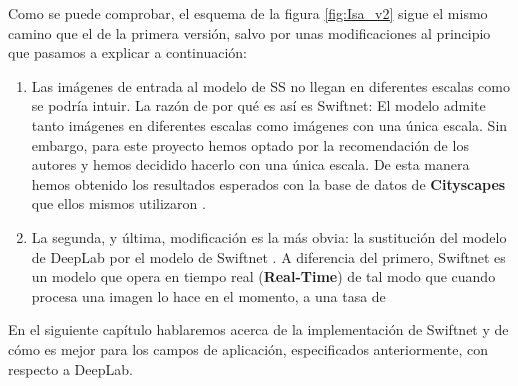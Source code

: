Como se puede comprobar, el esquema de la figura \ref{fig:Isa_v2} sigue el mismo camino que el de la primera versión, salvo por unas modificaciones al principio que pasamos a explicar a continuación:

\begin{enumerate}

\item Las imágenes de entrada al modelo de \ac{SS} no llegan en diferentes escalas como se podría intuir. La razón de por qué es así es Swiftnet: El modelo admite tanto imágenes en diferentes escalas como imágenes con una única escala. Sin embargo, para este proyecto hemos optado por la recomendación de los autores \cite{github_swiftnet} y hemos decidido hacerlo con una única escala. De esta manera hemos obtenido los resultados esperados con la base de datos de \textbf{Cityscapes} \cite{cityscapes} que ellos mismos utilizaron \cite{swiftnet}.

\item La segunda, y última, modificación es la más obvia: la sustitución del modelo de DeepLab \cite{deeplab} por el modelo de Swiftnet \cite{swiftnet}. A diferencia del primero, Swiftnet es un modelo que opera en tiempo real (\textbf{Real-Time}) de tal modo que cuando procesa una imagen lo hace en el momento, a una tasa de %

\end{enumerate}


En el siguiente capítulo hablaremos acerca de la implementación de Swiftnet y de cómo es mejor para los campos de aplicación, especificados anteriormente, con respecto a DeepLab.
